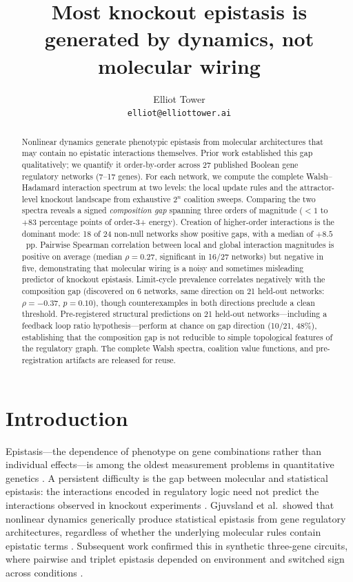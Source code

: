 \documentclass[11pt]{article}
\title{Most knockout epistasis is generated by dynamics, not molecular wiring}
\author{
  Elliot Tower \\
  \texttt{elliot@elliottower.ai}
}
\begin{document}
\maketitle

\begin{abstract}
Nonlinear dynamics generate phenotypic epistasis from molecular
architectures that may contain no epistatic interactions themselves.
Prior work established this gap qualitatively; we quantify it
order-by-order across 27 published Boolean gene regulatory networks
(7--17 genes). For each network, we compute the complete
Walsh--Hadamard interaction spectrum at two levels: the local update
rules and the attractor-level knockout landscape from exhaustive
$2^n$ coalition sweeps. Comparing the two spectra reveals a signed
\emph{composition gap} spanning three orders of magnitude ($< 1$ to
$+83$ percentage points of order-3+ energy). Creation of higher-order
interactions is the dominant mode: 18 of 24 non-null networks show
positive gaps, with a median of $+8.5$~pp. Pairwise Spearman
correlation between local and global interaction magnitudes is positive
on average (median $\rho = 0.27$, significant in 16/27 networks) but
negative in five, demonstrating that molecular wiring is a noisy and
sometimes misleading predictor of knockout epistasis. Limit-cycle prevalence correlates negatively with the composition gap
(discovered on 6 networks, same direction on 21 held-out networks:
$\rho = -0.37$, $p = 0.10$), though counterexamples in both
directions preclude a clean threshold. Pre-registered structural
predictions on 21 held-out networks---including a feedback loop ratio
hypothesis---perform at chance on gap direction (10/21, 48\%),
establishing that the composition gap is not reducible to simple
topological features of the regulatory graph. The complete Walsh spectra, coalition value functions, and
pre-registration artifacts are released for reuse.
\end{abstract}


\section{Introduction}
\label{sec:intro}

Epistasis---the dependence of phenotype on gene combinations rather
than individual effects---is among the oldest measurement problems in
quantitative genetics \citep{fisher1918correlation, bateson1909heredity}. A
persistent difficulty is the gap between molecular and statistical
epistasis: the interactions encoded in regulatory logic need not
predict the interactions observed in knockout experiments
\citep{phillips2008epistasis}. Gjuvsland et al.\ showed
that nonlinear dynamics generically produce statistical epistasis from
gene regulatory architectures, regardless of whether the underlying
molecular rules contain epistatic terms \citep{gjuvsland2007statistical}. Subsequent work confirmed this in synthetic three-gene
circuits, where pairwise and triplet epistasis depended on environment
and switched sign across conditions \citep{baier2023environment}.
\end{document}
